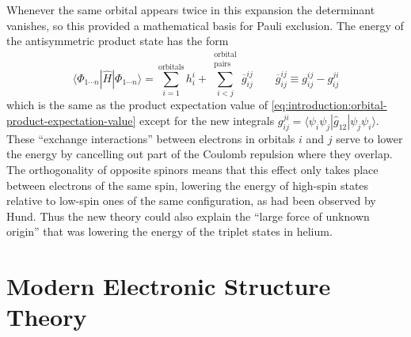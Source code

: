 Whenever the same orbital appears twice in this expansion the determinant
vanishes, so this provided a mathematical basis for Pauli exclusion.
The energy of the antisymmetric product state has the form
\begin{equation}
    \label{eq:introduction:determinant-expectation-value}
    \langle \Phi_{1\cdots n}|
    \hat{H}
    |\Phi_{1\cdots n} \rangle
    =
    \sum_{i=1}^\mathrm{orbitals}
    h_i^i
    +
    \sum_{i<j}^{\substack{\mathrm{orbital}\\\mathrm{pairs}}}
    \overline{g}_{ij}^{ij}
    \qquad
    \overline{g}_{ij}^{ij}
    \equiv
    g_{ij}^{ij}
    -
    g_{ij}^{ji}
\end{equation}
which is the same as the product expectation value of
\cref{eq:introduction:orbital-product-expectation-value} except for the new
integrals
\(
    g_{ij}^{ji}
    =
    \langle \psi_i\psi_j|\hat{g}_{12}|\psi_j\psi_i\rangle
\).
These ``exchange interactions'' between electrons in orbitals \(i\) and \(j\)
serve to lower the energy by cancelling out part of the Coulomb repulsion where
they overlap.
The orthogonality of opposite spinors means that this effect only takes place
between electrons of the same spin, lowering the energy of high-spin states
relative to low-spin ones of the same configuration, as had been observed by
Hund.\cite{Hund:1925p345}
Thus the new theory could also explain the ``large force of unknown
origin''\cite{Mehra:1982} that was lowering the energy of the triplet states in
helium.


\section{Modern Electronic Structure Theory}

